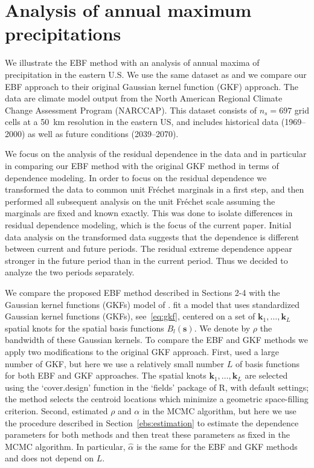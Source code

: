 \documentclass[12pt]{article}
\newcommand{\bk}{\ensuremath{\mathbf{k}}}
\newcommand{\bs}{\ensuremath{\mathbf{s}}}
\begin{document}
\section{Analysis of annual maximum precipitations}\label{ebs:analysis}  

We illustrate the EBF method with an analysis of annual maxima of precipitation in the eastern U.S.
We use the same dataset as \citet{Reich2012} and we compare our EBF approach to their original Gaussian kernel function (GKF) approach. 
The data are climate model output from the North American Regional Climate Change Assessment Program (NARCCAP).
This dataset consists of $n_s = 697$ grid cells at a 50~km resolution in the eastern US, and includes historical data (1969--2000) as well as future conditions (2039--2070). 

We focus on the analysis of the residual dependence in the data and in particular in comparing our EBF method with the original GKF method in terms of dependence modeling. In order to focus on the residual dependence we transformed the data to common unit Fr\'echet marginals in a first step, and then performed all subsequent analysis on the unit Fr\'echet scale assuming the marginals are fixed and known exactly. 
This was done to isolate differences in residual dependence modeling, which is the focus of the current paper. 
Initial data analysis on the transformed data suggests that the dependence is different between current and future periods. The residual extreme dependence appear stronger in the future period than in the current period. Thus we decided to analyze the two periods separately.

We compare the proposed EBF method described in Sections 2-4 with the Gaussian kernel functions (GKFs) model of \citet{Reich2012}. \citet{Reich2012} fit a model that uses standardized Gaussian kernel functions (GKFs), see~\eqref{eq:gkf}, centered on a set of $\bk_1, \ldots, \bk_L$ spatial knots for the spatial basis functions $B_l(\bs)$. We denote by $\rho$ the bandwidth of these Gaussian kernels. 
To compare the EBF and GKF methods we apply two modifications to the original GKF approach. First, \citet{Reich2012} used a large number of GKF, but here we use a relatively small number $L$ of basis functions for both EBF and GKF approaches. The spatial knots $\bk_1, \ldots, \bk_L$ are selected using the `cover.design' function in the `fields' \citep{fields2015} package of R, with default settings; the method selects the centroid locations which minimize a geometric space-filling criterion. Second, \citet{Reich2012} estimated $\rho$ and $\alpha$ in the MCMC algorithm, but here we use the procedure described in Section~\ref{ebs:estimation} to estimate the dependence parameters for both methods and then treat these parameters as fixed in the MCMC algorithm. In particular, $\hat\alpha$ is the same for the EBF and GKF methods and does not depend on $L$.
\end{document}
